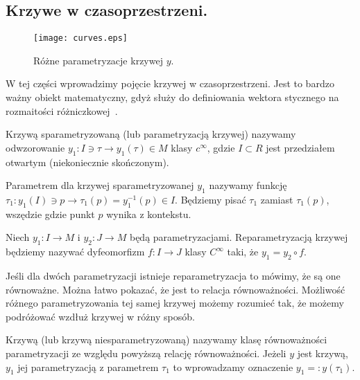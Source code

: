 \subsection{Krzywe w czasoprzestrzeni.}
\begin{wrapfigure}{r}{5cm}
\centering
\texttt{[image: curves.eps]}
\caption{Różne parametryzacje krzywej $y$.}
\end{wrapfigure}
W tej części wprowadzimy pojęcie krzywej w czasoprzestrzeni. 
Jest to bardzo ważny obiekt matematyczny, gdyż służy do definiowania
wektora stycznego na rozmaitości różniczkowej~\cite{ganca1987}. 
\begin{definition}
Krzywą sparametryzowaną (lub parametryzacją krzywej) nazywamy 
odwzorowanie 
$ y_1 : I \ni \tau \to y_1(\tau) \in M$ klasy $c^\infty$, 
gdzie $I \subset R$ 
jest przedziałem otwartym (niekoniecznie skończonym).
\end{definition}
\begin{definition}
Parametrem dla krzywej sparametryzowanej $y_1$ 
nazywamy funkcję $ \tau_1: y_1(I) \ni p 
\to \tau_1(p) = y_1^{-1}( p )\in I$. 
Będziemy pisać
$\tau_1$ zamiast $\tau_1(p)$, wszędzie gdzie punkt $p$ 
wynika z kontekstu.
\end{definition}
\begin{definition}
Niech $y_1: I \to M$ i $y_2:J\to M$ będą parametryzacjami.
Reparametryzacją krzywej będziemy nazywać dyfeomorfizm $f : I \to J$
klasy $C^\infty$
taki, że $y_1 = y_2 \circ f$.
\end{definition}
Jeśli dla dwóch parametryzacji istnieje reparametryzacja to 
mówimy, że są one równoważne. Można łatwo pokazać, że jest to
relacja równoważności. Możliwość różnego parametryzowania tej 
samej krzywej możemy rozumieć tak, że możemy podróżować wzdłuż
krzywej w różny sposób.
\begin{definition}
Krzywą (lub krzywą niesparametryzowaną) nazywamy klasę równoważności
parametryzacji ze względu powyższą relację równoważności.
Jeżeli $y$ jest krzywą, $y_1$ jej parametryzacją z parametrem $\tau_1$
to wprowadzamy oznaczenie $y_1 =: y(\tau_1)$.
\end{definition}
